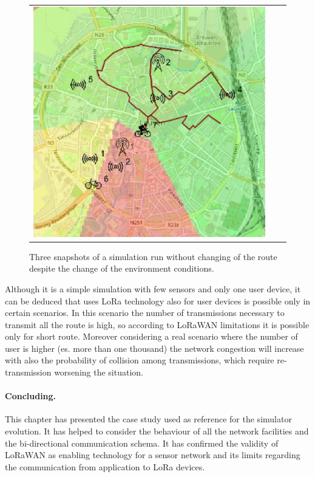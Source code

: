 \begin{figure}[h]
\begin{tabular}{lll}
         \includegraphics[scale=0.42]{figures/sim2snap3.png} 
    \end{tabular}
    \caption[Three snapshots of a simulation run without changing of the route]{Three snapshots of a simulation run without changing of the route despite the change of the environment conditions.}
    \label{fig:sim2}
\end{figure}
% 

Although it is a simple simulation with few sensors and only one user device, it can be deduced that uses LoRa technology also for user devices is possible only in certain scenarios.
In this scenario the number of transmissions necessary to transmit all the route is high, so according to LoRaWAN limitations it is possible only for short route.
Moreover considering a real scenario where the number of user is higher (es. more than one thousand) the network congestion will increase with also the probability of collision among transmissions, which require re-transmission worsening the situation.

\paragraph{Concluding.} This chapter has presented the case study used as reference for the simulator evolution.
It has helped to consider the behaviour of all the network facilities and the bi-directional communication schema.
It has confirmed the validity of LoRaWAN as enabling technology for a sensor network and its limits regarding the communication from application to LoRa devices.